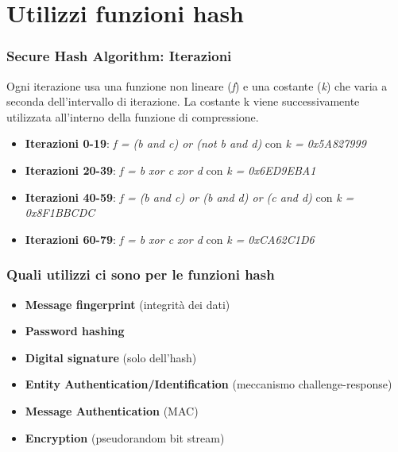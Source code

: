 \section{Utilizzi funzioni hash}

\begin{frame}
\frametitle{Secure Hash Algorithm: Iterazioni}

Ogni iterazione usa una funzione non lineare (\textit{f}) e una costante (\textit{k}) che varia a seconda dell'intervallo di iterazione.
La costante k viene successivamente utilizzata all'interno della funzione di compressione.

\begin{itemize}
    \item \textbf{Iterazioni 0-19}: \textit{f = (b and c) or (not b and d)} con \textit{k = 0x5A827999}
    \item \textbf{Iterazioni 20-39}: \textit{f = b xor c xor d} con \textit{k = 0x6ED9EBA1}
    \item \textbf{Iterazioni 40-59}: \textit{f = (b and c) or (b and d) or (c and d)} con \textit{k = 0x8F1BBCDC}
    \item \textbf{Iterazioni 60-79}: \textit{f = b xor c xor d} con \textit{k = 0xCA62C1D6}
    \end{itemize}

\end{frame}

\begin{frame}
\frametitle{Quali utilizzi ci sono per le funzioni hash}
\begin{itemize}
    \item \textbf{Message fingerprint} (integrità dei dati)
    \item \textbf{Password hashing}
    \item \textbf{Digital signature} (solo dell'hash)
    \item \textbf{Entity Authentication/Identification} (meccanismo challenge-response)
    \item \textbf{Message Authentication} (MAC)
    \item \textbf{Encryption} (pseudorandom bit stream)
\end{itemize}
\end{frame}

